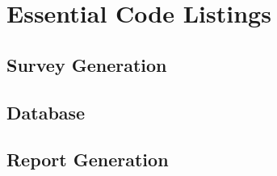 \documentclass[../final.tex]{subfiles}
\begin{document}
\section{Essential Code Listings}
\subsection{Survey Generation}
\subsection{Database}
\subsection{Report Generation}
\end{document}
